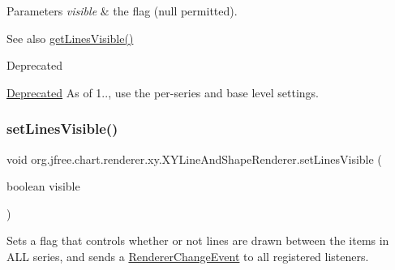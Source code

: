 \begin{DoxyParams}{Parameters}
{\em visible} & the flag ({\ttfamily null} permitted).\\
\hline
\end{DoxyParams}
\begin{DoxySeeAlso}{See also}
\mbox{\hyperlink{classorg_1_1jfree_1_1chart_1_1renderer_1_1xy_1_1_x_y_line_and_shape_renderer_af0fece769cf57e414721478f2b43411c}{get\+Lines\+Visible()}}
\end{DoxySeeAlso}
\begin{DoxyRefDesc}{Deprecated}
\item[\mbox{\hyperlink{deprecated__deprecated000243}{Deprecated}}]As of 1.., use the per-\/series and base level settings. \end{DoxyRefDesc}
\mbox{\label{classorg_1_1jfree_1_1chart_1_1renderer_1_1xy_1_1_x_y_line_and_shape_renderer_a6ec940bf380513700d9bfe332f4f357b}} 
\subsubsection{\texorpdfstring{set\+Lines\+Visible()}{setLinesVisible()}\hspace{0.1cm}{\footnotesize\ttfamily [2/2]}}
{\footnotesize\ttfamily void org.\+jfree.\+chart.\+renderer.\+xy.\+X\+Y\+Line\+And\+Shape\+Renderer.\+set\+Lines\+Visible (\begin{DoxyParamCaption}\item[{boolean}]{visible }\end{DoxyParamCaption})}

Sets a flag that controls whether or not lines are drawn between the items in A\+LL series, and sends a \mbox{\hyperlink{}{Renderer\+Change\+Event}} to all registered listeners.


